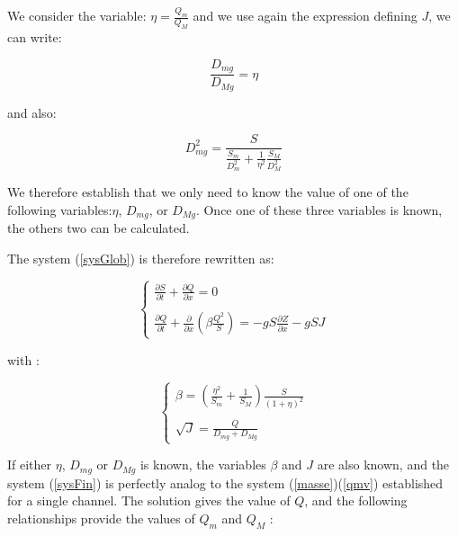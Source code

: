 \vspace{0.5cm}

We consider the variable: $\eta = \frac{Q_m}{Q_M}$ and we use again the expression defining $J$, we can write:

\begin{equation}
    \frac{D_{mg}}{D_{Mg}} = \eta
\end{equation}

and also:

\begin{equation}
     D_{mg}^2 = \frac{S}{\displaystyle  \frac{S_m}{D_{m}^2}+ \frac{1}{\eta^2}\frac{S_M}{D_{M}^2}}
\end{equation}

\vspace{0.5cm}

We therefore establish that we only need to know the value of one of the following variables:$\eta$, $D_{mg}$, or $D_{Mg}$. Once one of these three variables is known, the others two can be calculated.

\vspace{0.5cm}

The system (\ref{sysGlob}) is therefore rewritten as:

\begin{equation}
 \label{sysFin}
 \left \lbrace
  \begin{array}{l}
    \frac{\partial{S}}{\partial{t}} + \frac{\partial{Q}}{\partial{x}} = 0 \\
    \\
    \frac{\partial{Q}}{\partial{t}} + \frac{\partial}{\partial{x}} \left ( \beta \frac{Q^2}{S} \right ) = -g S \frac{\partial{Z}}{\partial{x}} - g S J
  \end{array}
 \right.
\end{equation}

with :

\begin{equation}
 \left \lbrace
  \begin{array}{l}
    \beta = \left ( \frac{\eta^2}{S_m} + \frac{1}{S_M} \right ) \frac{S}{(1+\eta)^2} \\
    \\
    \sqrt{J} = \frac{Q}{D_{mg}+D_{Mg}}
  \end{array}
 \right.
\end{equation}

\vspace{0.5cm}

If either $\eta$, $D_{mg}$ or $D_{Mg}$ is known, the variables $\beta$ and $J$ are also known, and the system (\ref{sysFin}) is perfectly analog to the system (\ref{masse})(\ref{qmv}) established for a single channel. The solution gives the value of $Q$, and the following relationships provide the values of $Q_m$ and $Q_M$ :

